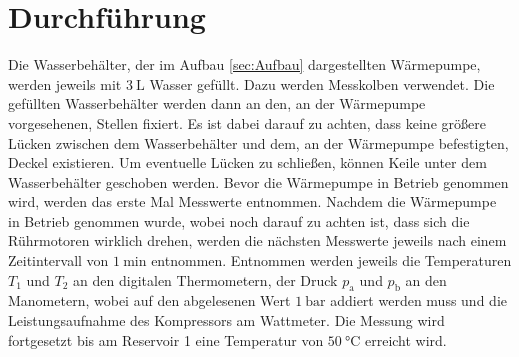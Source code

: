 
\section{Durchführung}
\label{sec:Durchführung}

Die Wasserbehälter, der im Aufbau \ref{sec:Aufbau} dargestellten Wärmepumpe, werden jeweils mit $\SI{3}{\liter}$ Wasser gefüllt. Dazu werden Messkolben verwendet. Die gefüllten Wasserbehälter werden dann an den, an der Wärmepumpe vorgesehenen, Stellen fixiert. Es ist dabei darauf zu achten, dass keine größere Lücken zwischen dem Wasserbehälter und dem, an der Wärmepumpe befestigten, Deckel existieren. Um eventuelle Lücken zu schließen, können Keile unter dem Wasserbehälter geschoben werden. Bevor die Wärmepumpe in Betrieb genommen wird, werden das erste Mal Messwerte entnommen. Nachdem die Wärmepumpe in Betrieb genommen wurde, wobei noch darauf zu achten ist, dass sich die Rührmotoren wirklich drehen, werden die nächsten Messwerte jeweils nach einem Zeitintervall von $\SI{1}{\minute}$ entnommen. Entnommen werden jeweils die Temperaturen $T_1$ und $T_2$ an den digitalen Thermometern, der Druck $p_\text{a}$ und $p_\text{b}$ an den Manometern, wobei auf den abgelesenen Wert $\SI{1}{\bar}$ addiert werden muss und die Leistungsaufnahme des Kompressors am Wattmeter. Die Messung wird fortgesetzt bis am Reservoir 1 eine Temperatur von $\SI{50}{\degreeCelsius}$ erreicht wird.